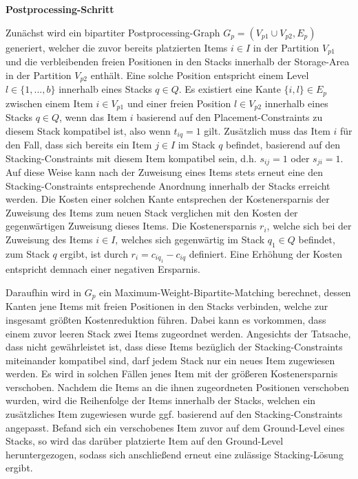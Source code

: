 \textbf{Postprocessing-Schritt}

Zunächst wird ein bipartiter Postprocessing-Graph $G_p = (V_{p1} \cup V_{p2}, E_p)$ generiert, welcher die zuvor bereits platzierten Items $i \in I$ in der Partition $V_{p1}$ und die verbleibenden freien Positionen in den Stacks innerhalb der Storage-Area in der Partition $V_{p2}$ enthält. Eine solche Position entspricht einem Level $l \in \{1, ..., b\}$ innerhalb eines Stacks $q \in Q$. Es existiert eine Kante $\{i, l\} \in E_p$ zwischen einem Item $i \in V_{p1}$ und einer freien Position $l \in V_{p2}$ innerhalb eines Stacks $q \in Q$, wenn das Item $i$ basierend auf den Placement-Constraints zu diesem Stack kompatibel ist, also wenn $t_{iq} = 1$ gilt. Zusätzlich muss das Item $i$ für den Fall, dass sich bereits ein Item $j \in I$ im Stack $q$ befindet, basierend auf den Stacking-Constraints mit diesem Item kompatibel sein, d.h. $s_{ij} = 1$ oder $s_{ji} = 1$.
Auf diese Weise kann nach der Zuweisung eines Items stets erneut eine den Stacking-Constraints entsprechende Anordnung innerhalb der Stacks erreicht werden. Die Kosten einer solchen Kante entsprechen der Kostenersparnis der Zuweisung des Items zum neuen Stack verglichen mit den Kosten der gegenwärtigen Zuweisung dieses Items. Die Kostenersparnis $r_i$, welche sich bei der Zuweisung des Items $i \in I$, welches sich gegenwärtig im Stack $q_1 \in Q$ befindet, zum Stack $q$ ergibt, ist durch $r_i = c_{iq_1} - c_{iq}$ definiert. Eine Erhöhung der Kosten entspricht demnach einer negativen Ersparnis.

Daraufhin wird in $G_p$ ein Maximum-Weight-Bipartite-Matching berechnet, dessen Kanten jene Items mit freien
Positionen in den Stacks verbinden, welche zur insgesamt größten Kostenreduktion führen.
Dabei kann es vorkommen, dass einem zuvor leeren Stack zwei Items zugeordnet werden. Angesichts der Tatsache,
dass nicht gewährleistet ist, dass diese Items bezüglich der Stacking-Constraints miteinander kompatibel sind,
darf jedem Stack nur ein neues Item zugewiesen werden.
Es wird in solchen Fällen jenes Item mit der größeren Kostenersparnis verschoben.
Nachdem die Items an die ihnen zugeordneten Positionen verschoben wurden,
wird die Reihenfolge der Items innerhalb der Stacks, welchen ein zusätzliches Item zugewiesen
wurde ggf. basierend auf den Stacking-Constraints angepasst.
Befand sich ein verschobenes Item zuvor auf dem Ground-Level eines Stacks,
so wird das darüber platzierte Item auf den Ground-Level heruntergezogen,
sodass sich anschließend erneut eine zulässige Stacking-Lösung ergibt.

